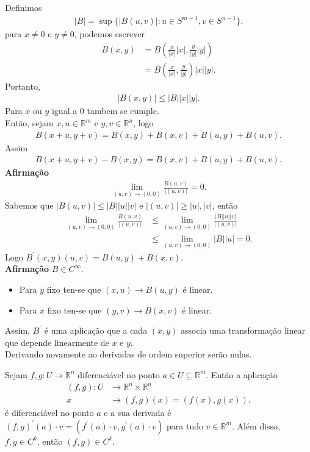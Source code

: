 \begin{example}
  Definimos
  \begin{align*}
    |B|=\sup\{|B(u,v)|:u\in S^{m-1},v\in S^{n-1}\}.
  \end{align*}
  para $x\neq 0$ e $y\neq 0$, podemos escrever
  \begin{align*}
    B(x,y)&=B\left( \frac{x}{|x|}|x|,\frac{y}{|y|}|y|\right)\\
    &=B\left( \frac{x}{|x|},\frac{y}{|y|}\right)|x||y|.
  \end{align*}
  Portanto,
  \begin{align*}
    |B(x,y)|\leq |B||x||y|.
  \end{align*}
  Para $x$ ou $y$ igual a $0$ tambem se cumple.\\
  Então, sejam $x,u\in \mathbb{R}^{m}$ e $y,v\in\mathbb{R}^{n}$, logo
  \begin{align*}
    B(x+u,y+v)=B(x,y)+B(x,v)+B(u,y)+B(u,v).
  \end{align*}
  Assim
  \begin{align*}
    B(x+u,y+v)-B(x,y)=B(x,v)+B(u,y)+B(u,v).
  \end{align*}
  \textbf{Afirmação}
  \begin{align*}
    \lim_{(u,v) \to (0,0)}\frac{B(u,v)}{|(u,v)|}=0.
  \end{align*}
  Sabemos que $|B(u,v)|\leq |B||u||v|$ e $|(u,v)|\geq |u|,|v|$, então
  \begin{align*}
    \lim_{(u,v) \to (0,0)}\frac{B(u,v)}{|(u,v)|}&\leq \lim_{(u,v) \to (0,0)}\frac{|B||u||v|}{|(u,v)|}\\
    &\leq \lim_{(u,v) \to (0,0)}|B||u|=0.
  \end{align*}
  Logo $B^{\prime}(x,y)(u,v)=B(u,y)+B(x,v)$.\\
  \textbf{Afirmação} $B\in C^{\infty}$.
  \begin{itemize}
    \item Para $y$ fixo ten-se que $(x,u)\to B(u,y)$ é linear. 
    \item Para $x$ fixo ten-se que $(y,v)\to B(x,v)$ é linear. 
  \end{itemize}
  Assim, $B^{\prime}$ é uma aplicação que a cada $(x,y)$ associa uma transformação linear que depende linearmente de $x$ e $y$.\\
  Derivando novamente ao derivadas de ordem superior serão nulas.
\end{example}
\begin{example}
  Sejam $f,g:U\to\mathbb{R}^{n}$ diferenciável no ponto $a\in U\subseteq\mathbb{R}^{m}$. Então a aplicação
  \begin{align*}
    (f,g):U&\to\mathbb{R}^{n}\times\mathbb{R}^{n}\\
    x&\to(f,g)(x)=(f(x),g(x)).
  \end{align*}
  é diferenciável no ponto $a$ e a sua derivada é $(f,g)^{\prime}(a)\cdot v=(f^{\prime}(a)\cdot v,g^{\prime}(a)\cdot v)$ para tudo $v\in\mathbb{R}^{m}$.
  Além disso, $f,g\in C^{k}$, então $(f,g)\in C^{k}$.
\end{example}
